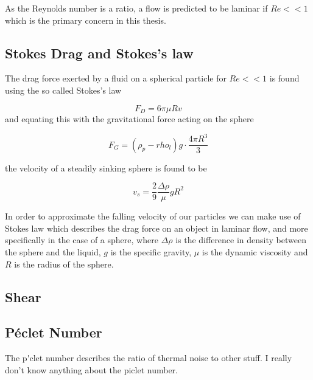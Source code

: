 As the Reynolds number is a ratio, a flow is predicted to be laminar if $Re << 1$ which is the primary concern in this thesis.

\subsection{Stokes Drag and Stokes's law}
The drag force exerted by a fluid on a spherical particle for $Re << 1$ is found using the so called Stokes's law \cite{introfluid2}

\begin{equation}
F_D = 6\pi \mu R v
\end{equation}
and equating this with the gravitational force acting on the sphere

\begin{equation}
F_G = (\rho_p - rho_l) g\cdot \frac{4\pi R^3}{3}
\end{equation}

the velocity of a steadily sinking sphere is found to be 

\begin{equation}\label{eq:fallingSphere}
v_s = \frac{2}{9} \frac{\Delta \rho}{\mu} g R^2
\end{equation}

In order to approximate the falling velocity of our particles we can make use of Stokes law which describes the drag force on an object in laminar flow, and more specifically in the case of a sphere, 
where $\Delta\rho$ is the difference in density between the sphere and the liquid, $g$ is the specific gravity, $\mu$ is the dynamic viscosity and $R$ is the radius of the sphere.  



\subsection{Shear}

\subsection{P\'{e}clet Number}
The p\'{}clet number describes the ratio of thermal noise to other stuff. I really don't know anything about the piclet number.

